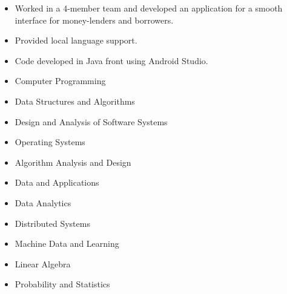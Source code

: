 \documentclass[10pt,a4paper,ragged2e,withhyper]{altacv}
\begin{document}
\begin{paracol}{2}
\begin{itemize}
  \item \textbf {} Worked in a 4-member team and developed an application for a smooth interface for money-lenders and borrowers.
  \vspace{2mm} %
  \item \textbf {} Provided local language support.  
  \vspace{2mm} %
  \item \textbf {}  Code developed in Java front using Android Studio.
\end{itemize}


\begin{itemize}
  \item Computer Programming
  \item Data Structures and Algorithms 
  \item Design and Analysis of Software Systems 
  \item Operating Systems  
  \item Algorithm Analysis and Design
  \item Data and Applications  
  \item Data Analytics
  \item Distributed Systems
  \item Machine Data and Learning
  \item Linear Algebra
  \item Probability and Statistics
  \vspace{2mm} %
\end{itemize}






\end{paracol}
\end{document}
